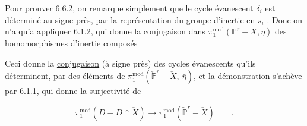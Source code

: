 Pour prouver 6.6.2, on remarque simplement que le cycle évanescent $\delta_{i}$ est déterminé au signe près, par la représentation du groupe d'inertie en $s_{i}$ . Donc on n'a qu'a appliquer 6.1.2, qui donne la conjugaison dans $\pi_{1}^{\mathrm{mod}}(\mathbb{P}^{r} - X,\bar{\eta})$ des homomorphismes d'inertie composés

\begin{center}
\end{center}
Ceci donne la \underline{conjugaison} (à signe près) des cycles évanescents qu'ils déterminent, par des éléments de $\pi_{1}^{\mathrm{mod}}(\check{\mathbb{P}}^{r} - \check{X},\ \bar{\eta})$, et la démonstration s'achève par 6.1.1, qui donne la surjectivité de

\begin{equation*}
\pi_{1}^{\mathrm{mod}}(D - D \cap \check{X}) \longrightarrow \pi_{1}^{\mathrm{mod}}(\check{\mathbb{P}}^{r} - \check{X}) \qquad .
\end{equation*}

